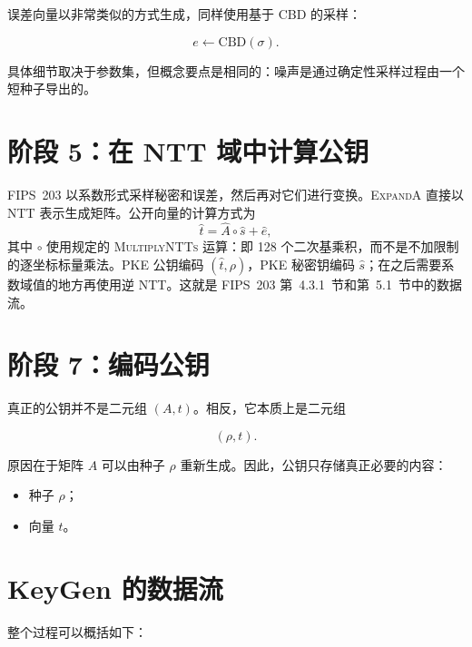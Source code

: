 误差向量以非常类似的方式生成，同样使用基于 CBD 的采样：

\[
e \leftarrow \mathrm{CBD}(\sigma).
\]

具体细节取决于参数集，但概念要点是相同的：噪声是通过确定性采样过程由一个短种子导出的。

\section{阶段 5：在 NTT 域中计算公钥}

FIPS~203 以系数形式采样秘密和误差，然后再对它们进行变换。\textsc{ExpandA} 直接以 NTT 表示生成矩阵。公开向量的计算方式为
\[
\hat t=\hat A\circ\hat s+\hat e,
\]
其中 $\circ$ 使用规定的 \textsc{MultiplyNTTs} 运算：即 128 个二次基乘积，而不是不加限制的逐坐标标量乘法。PKE 公钥编码 $(\hat t,\rho)$，PKE 秘密钥编码 $\hat s$；在之后需要系数域值的地方再使用逆 NTT。这就是 FIPS~203 第~4.3.1~节和第~5.1~节中的数据流。

\section{阶段 7：编码公钥}

真正的公钥并不是二元组 \((A,t)\)。相反，它本质上是二元组

\[
(\rho, t).
\]

原因在于矩阵 $A$ 可以由种子 $\rho$ 重新生成。因此，公钥只存储真正必要的内容：

\begin{itemize}
  \item 种子 $\rho$；
  \item 向量 $t$。
\end{itemize}

\section{KeyGen 的数据流}

整个过程可以概括如下：

